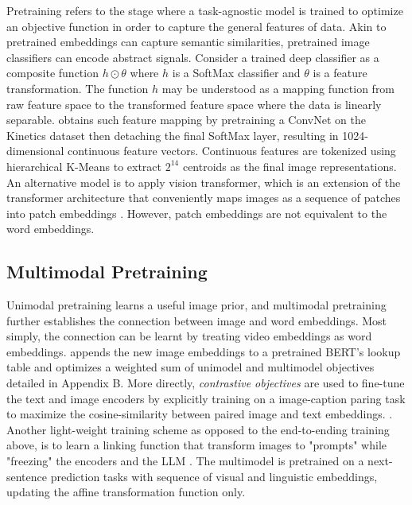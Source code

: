 \documentclass[11pt]{article}
\begin{document}
Pretraining refers to the stage where a task-agnostic model is trained to optimize an objective function in order to capture the general features of data. Akin to pretrained embeddings can capture semantic similarities, pretrained image classifiers can encode abstract signals. Consider a trained deep classifier as a composite function $h \odot \theta$ where $h$ is a SoftMax classifier and $\theta$ is a feature transformation. The function $h$ may be understood as a mapping function from raw feature space to the transformed feature space where the data is linearly separable. \citet{DBLP:conf/iccv/SunMV0S19} obtains such feature mapping by pretraining a ConvNet on the Kinetics dataset then detaching the final SoftMax layer, resulting in 1024-dimensional continuous feature vectors. Continuous features are tokenized using hierarchical K-Means to extract $2^{14}$ centroids as the final image representations. An alternative model is to apply vision transformer, which is an extension of the transformer architecture that conveniently maps images as a sequence of patches into patch embeddings \citep{DBLP:conf/iclr/DosovitskiyB0WZ21, DBLP:conf/icml/DriessXSLCIWTVY23, DBLP:conf/icml/RadfordKHRGASAM21}. However, patch embeddings are not equivalent to the word embeddings. 

\subsection{Multimodal Pretraining}
Unimodal pretraining learns a useful image prior, and multimodal pretraining further establishes the connection between image and word embeddings. Most simply, the connection can be learnt by treating video embeddings as word embeddings. \citet{DBLP:conf/iccv/SunMV0S19} appends the new image embeddings to a pretrained BERT's lookup table and optimizes a weighted sum of unimodel and multimodel objectives detailed in Appendix B. More directly, \textit{contrastive objectives} are used to fine-tune the text and image encoders by explicitly training on a image-caption paring task to maximize the cosine-similarity between paired image and text embeddings. \citep{DBLP:conf/icml/RadfordKHRGASAM21}. Another light-weight training scheme as opposed to the end-to-ending training above, is to learn a linking function that transform images to "prompts" while "freezing" the encoders and the LLM \citep{DBLP:conf/icml/DriessXSLCIWTVY23}. The multimodel is pretrained on a next-sentence prediction tasks with sequence of visual and linguistic embeddings, updating the affine transformation function only.
\end{document}
